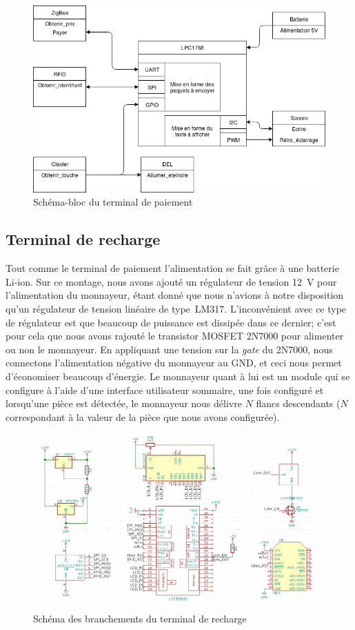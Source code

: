 	\begin{figure}[p]
		\includegraphics[width=\textwidth]{Pictures/Branchements/Paiement_Bloc}
		\caption{Schéma-bloc du terminal de paiement}
		\label{fig.blocPaiement}
	\end{figure}
		
	\subsection{Terminal de recharge}
	Tout comme le terminal de paiement l’alimentation se fait grâce à une batterie Li-ion. Sur ce montage, nous avons ajouté un régulateur de tension 12~V pour l’alimentation du monnayeur, étant donné que nous n’avions à notre disposition qu’un régulateur de tension linéaire de type~LM317. L'inconvénient avec ce type de régulateur est que beaucoup de puissance est dissipée dans ce dernier; c’est pour cela que nous avons rajouté le transistor MOSFET 2N7000 pour alimenter ou non le monnayeur. En appliquant une tension sur la \emph{gate} du 2N7000, nous connectons l’alimentation négative du monnayeur au GND, et ceci nous permet d'économiser beaucoup d’énergie. Le monnayeur quant à lui est un module qui se configure à l’aide d’une interface utilisateur sommaire, une fois configuré et lorsqu’une pièce est détectée, le monnayeur nous délivre $N$ flancs descendants ($N$ correspondant à la valeur de la pièce que nous avons configurée).

	\begin{figure}[p]
		\includegraphics[width=\textwidth]{Pictures/Branchements/Terminal_Recharge}
		\caption{Schéma des branchements du terminal de recharge}
		\label{fig.branchRecharge}
	\end{figure}


